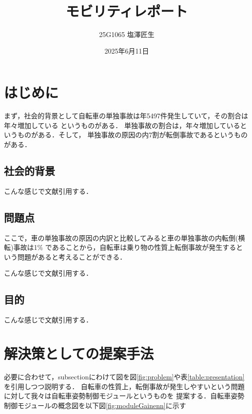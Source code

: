 \documentclass[uplatex,dvipdfmx]{jsarticle}
\begin{document}
\title{モビリティレポート}
\author{25G1065 塩澤匠生}
\date{2025年6月11日}
\maketitle
\section{はじめに}


まず，社会的背景として自転車の単独事故は年5497件発生していて，その割合は年々増加している
というものがある\cite{jikokensuu}．
単独事故の割合は，年々増加しているというものがある．そして，
単独事故の原因の内7割が転倒事故であるというものがある\cite{tandokuWariai}．

\subsection{社会的背景}
こんな感じで文献引用する\cite{ref:nobukawa2023,ref:nobukawa2023_2}．

\subsection{問題点}

ここで，車の単独事故の原因の内訳と比較してみると車の単独事故の内転倒(横転)事故は1\%
であることから，自転車は乗り物の性質上転倒事故が発生するという問題があると考えることができる．




こんな感じで文献引用する\cite{ref:nobukawa2023,ref:nobukawa2023_2}．

\subsection{目的}
こんな感じで文献引用する\cite{ref:nobukawa2023,ref:nobukawa2023_2}．

\section{解決策としての提案手法}
必要に合わせて，subsectionにわけて図を図\ref{fig:problem}や表\ref{table:presentation}
を引用しつつ説明する．
自転車の性質上，転倒事故が発生しやすいという問題に対して我々は自転車姿勢制御モジュールというものを
提案する．自転車姿勢制御モジュールの概念図を以下図\ref{fig:moduleGainenn}に示す
\end{document}
